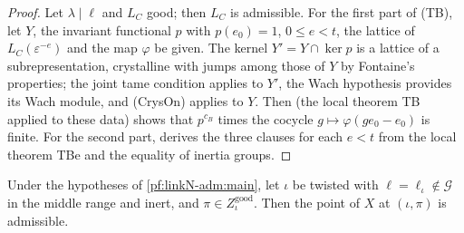 \begin{proof}
Let $\lambda\mid\ell$ and $L_C$ good; then $L_C$ is admissible. For the first part of (TB), let $Y$, the invariant
functional $p$ with $p(e_0)=1$, $0\le e<t$, the lattice of $L_C(\varepsilon^{-e})$ and the map $\varphi$ be given. The kernel
$Y'=Y\cap\ker p$ is a lattice of a subrepresentation, crystalline with jumps among those of $Y$ by Fontaine's
properties; the joint tame condition applies to $Y'$, the Wach hypothesis provides its Wach module, and
(CrysOn) applies to $Y$. Then  (the local theorem TB applied to
these data) shows that $p^{c_B}$ times the cocycle $g\mapsto\varphi(ge_0-e_0)$ is finite.
For the second part,  derives the three clauses for each $e<t$ from the local
theorem TBe and the equality of inertia groups.
\end{proof}

\begin{theorem}\label{pf:linkN-adm:inert}
Under the hypotheses of \cref{pf:linkN-adm:main}, let $\iota$ be twisted with $\ell=\ell_\iota\notin\mathcal G$ in the middle
range and inert, and $\pi\in Z^{\mathrm{good}}_\iota$. Then the point of $X$ at $(\iota,\pi)$ is admissible.
\end{theorem}

